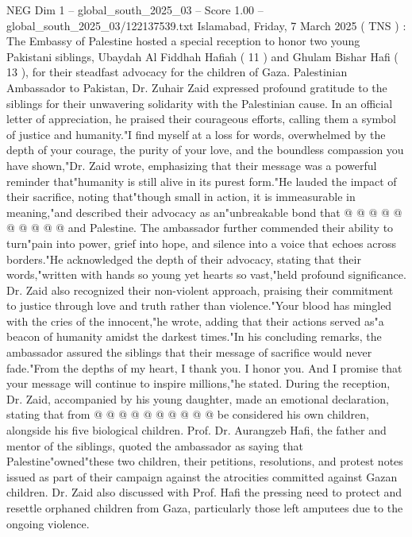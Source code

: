 \begin{textsample}{NEG Dim 1 – global\_south\_2025\_03 – Score 1.00 – global\_south\_2025\_03/122137539.txt}  \label{ex:f1_neg_186}
Islamabad, Friday, 7 March 2025 ( TNS ) : The Embassy of Palestine hosted a special reception to honor two young Pakistani siblings, Ubaydah Al Fiddhah Hafiah ( 11 ) and Ghulam Bishar Hafi ( 13 ), for their steadfast advocacy for the children of Gaza.
Palestinian Ambassador to Pakistan, Dr.
Zuhair Zaid expressed profound gratitude to the siblings for their unwavering solidarity with the Palestinian cause.
In an official letter of appreciation, he praised their courageous efforts, calling them a symbol of justice and humanity."I find myself at a loss for words, overwhelmed by the depth of your courage, the purity of your love, and the boundless compassion you have shown,"Dr.
Zaid wrote, emphasizing that their message was a powerful reminder that"humanity is still alive in its purest form."He lauded the impact of their sacrifice, noting that"though small in action, it is immeasurable in meaning,"and described their advocacy as an"unbreakable bond that @ @ @ @ @ @ @ @ @ @ and Palestine.
The ambassador further commended their ability to turn"pain into power, grief into hope, and silence into a voice that echoes across borders."He acknowledged the depth of their advocacy, stating that their words,"written with hands so young yet hearts so vast,"held profound significance.
Dr.
Zaid also recognized their non-violent approach, praising their commitment to justice through love and truth rather than violence."Your blood has mingled with the cries of the innocent,"he wrote, adding that their actions served as"a beacon of humanity amidst the darkest times."In his concluding remarks, the ambassador assured the siblings that their message of sacrifice would never fade."From the depths of my heart, I thank you.
I honor you.
And I promise that your message will continue to inspire millions,"he stated.
During the reception, Dr.
Zaid, accompanied by his young daughter, made an emotional declaration, stating that from @ @ @ @ @ @ @ @ @ @ be considered his own children, alongside his five biological children.
Prof.
Dr.
Aurangzeb Hafi, the father and mentor of the siblings, quoted the ambassador as saying that Palestine"owned"these two children, their petitions, resolutions, and protest notes issued as part of their campaign against the atrocities committed against Gazan children.
Dr.
Zaid also discussed with Prof.
Hafi the pressing need to protect and resettle orphaned children from Gaza, particularly those left amputees due to the ongoing violence.

\end{textsample}
